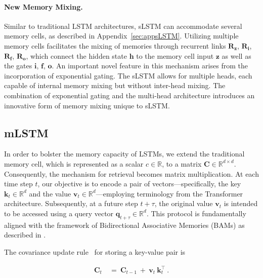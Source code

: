 \paragraph{New Memory Mixing.} Similar to traditional LSTM architectures, sLSTM can accommodate several memory cells, as described in Appendix~\ref{sec:appsLSTM}. Utilizing multiple memory cells facilitates the mixing of memories through recurrent links $\mathbf{R}_{\mathbf{z}}$, $\mathbf{R}_{\mathbf{i}}$, $\mathbf{R}_{\mathbf{f}}$, $\mathbf{R}_{\mathbf{o}}$, which connect the hidden state $\mathbf{h}$ to the memory cell input $\mathbf{z}$ as well as the gates $\mathbf{i}$, $\mathbf{f}$, $\mathbf{o}$. An important novel feature in this mechanism arises from the incorporation of exponential gating. The sLSTM allows for multiple heads, each capable of internal memory mixing but without inter-head mixing. The combination of exponential gating and the multi-head architecture introduces an innovative form of memory mixing unique to sLSTM.

\subsection{mLSTM}
\label{sec:mLSTM}

In order to bolster the memory capacity of LSTMs, we extend the traditional memory cell, which is represented as a scalar $c \in \mathbb{R}$, to a matrix $\mathbf{C} \in \mathbb{R}^{d \times d}$. Consequently, the mechanism for retrieval becomes matrix multiplication. At each time step $t$, our objective is to encode a pair of vectors—specifically, the key $\mathbf{k}_t \in \mathbb{R}^d$ and the value $\mathbf{v}_t \in \mathbb{R}^d$—employing terminology from the Transformer architecture. Subsequently, at a future step $t + \tau$, the original value $\mathbf{v}_t$ is intended to be accessed using a query vector $\mathbf{q}_{t+\tau} \in \mathbb{R}^d$. This protocol is fundamentally aligned with the framework of Bidirectional Associative Memories (BAMs) as described in \citep{Kohonen:72,Anderson:72,Nakano:72,Anderson:77}.

The covariance update rule~\citep{Sejnowski:77,Dayan:91} for storing a key-value pair is

\begin{align}
\mathbf{C}_t \ &= \ \mathbf{C}_{t-1} \ + \ \mathbf{v}_{t} \ \mathbf{k}_t^\top \ .
\end{align}

